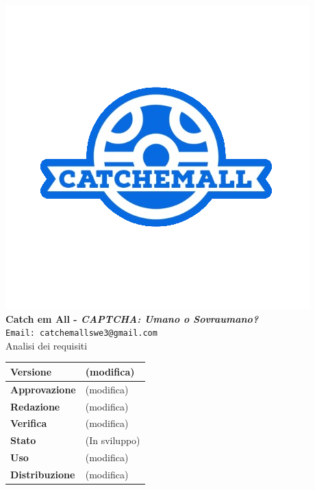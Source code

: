 \begin{titlepage}
\begin{center}
	\includegraphics[scale = 1.5]{img/logo.png}\\
	\bigskip
	\large \textbf{Catch em All - \textit{CAPTCHA: Umano o Sovraumano?}}\\
	\texttt{Email: catchemallswe3@gmail.com}\\
	\vfill
	{\fontsize{1.5cm}{0}\selectfont Analisi dei requisiti}\\
	\vfill
	\begin{tabular}{| C{4.5cm} | C{4.5cm} |}
		\hline
		\textbf{Versione} & (modifica)\\
		\hline
		\textbf{Approvazione} & (modifica)\\
		\hline
		\textbf{Redazione} & (modifica)\\
		\hline
		\textbf{Verifica} & (modifica)\\
		\hline
		\textbf{Stato} & (In sviluppo)\\
		\hline
		\textbf{Uso} & (modifica)\\
		\hline
		\textbf{Distribuzione} & (modifica)\\
		\hline
	\end{tabular}\\
\end{center}
\end{titlepage}